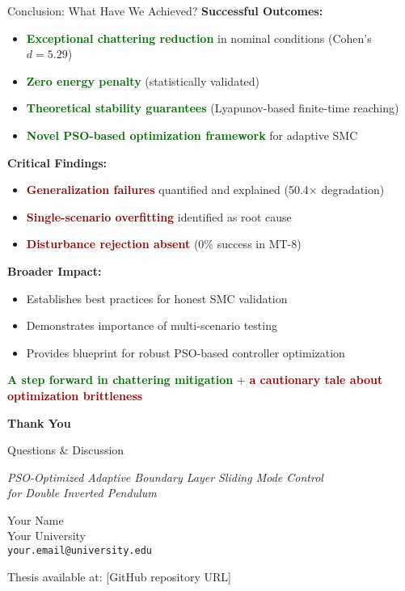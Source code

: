 \documentclass[10pt,aspectratio=169]{beamer}
\newcommand{\emphred}[1]{\textcolor{darkred}{\textbf{#1}}}
\newcommand{\emphgreen}[1]{\textcolor{darkgreen}{\textbf{#1}}}
\begin{document}
\begin{frame}{Conclusion: What Have We Achieved?}
\textbf{Successful Outcomes:}
\begin{itemize}
    \item \emphgreen{Exceptional chattering reduction} in nominal conditions (Cohen's $d = 5.29$)
    \item \emphgreen{Zero energy penalty} (statistically validated)
    \item \emphgreen{Theoretical stability guarantees} (Lyapunov-based finite-time reaching)
    \item \emphgreen{Novel PSO-based optimization framework} for adaptive SMC
\end{itemize}

\textbf{Critical Findings:}
\begin{itemize}
    \item \emphred{Generalization failures} quantified and explained (50.4$\times$ degradation)
    \item \emphred{Single-scenario overfitting} identified as root cause
    \item \emphred{Disturbance rejection absent} (0\% success in MT-8)
\end{itemize}

\textbf{Broader Impact:}
\begin{itemize}
    \item Establishes best practices for honest SMC validation
    \item Demonstrates importance of multi-scenario testing
    \item Provides blueprint for robust PSO-based controller optimization
\end{itemize}

\vspace{0.5cm}
\centering
\Large
\emphgreen{A step forward in chattering mitigation} + \emphred{a cautionary tale about optimization brittleness}
\end{frame}

\begin{frame}[plain]
\centering
\vspace{2cm}
{\Huge \textbf{Thank You}}

\vspace{1cm}
{\Large Questions \& Discussion}

\vspace{2cm}
\textit{PSO-Optimized Adaptive Boundary Layer Sliding Mode Control \\
for Double Inverted Pendulum}

\vspace{0.5cm}
Your Name \\
Your University \\
\texttt{your.email@university.edu}

\vspace{1cm}
{\small Thesis available at: [GitHub repository URL]}
\end{frame}
\end{document}
